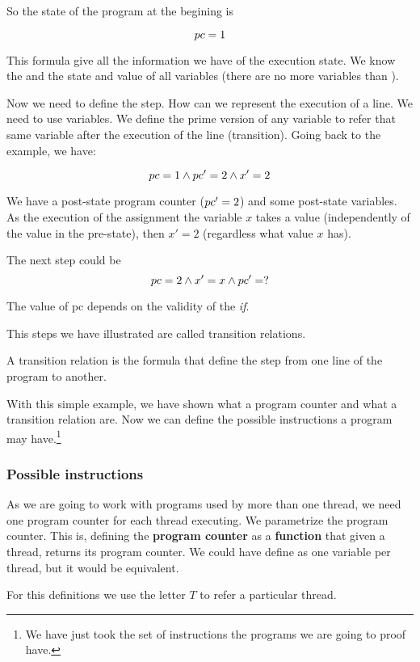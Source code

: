 So the state of the program at the begining is 

\[ pc = 1\]

This formula give all the information we have of the execution state. We know the \pc and the state and value of all variables (there are no more variables than \pc).

Now we need to define the step. 
%
How can we represent the execution of a line.
%
We need to use  variables. 
%
We define the prime version of any variable to refer that same variable after the execution of the line (transition). 
%
Going back to the example, we have:

\[
pc = 1 \wedge pc'=2 \wedge x'=2 
\]

We have a post-state program counter ($pc'=2$) and some post-state variables. 
%
As the execution of the assignment the variable $x$ takes a value (independently of the value in the pre-state), then $x'=2$ (regardless what value $x$ has). 

The next step could be
\[
pc = 2 \wedge x'=x \wedge 	pc'=?
\]

The value of pc depends on the validity of the \textit{if}. 

This steps we have illustrated are called transition relations.

\begin{defn}
A transition relation is the formula that define the step from one line of the program to another.  
\end{defn}

With this simple example, we have shown what a program counter and what a transition relation are. Now we can define the possible instructions a program may have.\footnote{We have just took the set of instructions the programs we are going to proof have.}



\subsubsection{Possible instructions}
As we are going to work with programs used by more than one thread, we need one program counter for each thread executing. 
%
We parametrize the program counter. 
%
This is, defining the \textbf{program counter} as a \textbf{function} that given a thread, returns its program counter. 
%
We could have define as one variable per thread, but it would be equivalent. 

For this definitions we use the letter $T$ to refer a particular thread.

